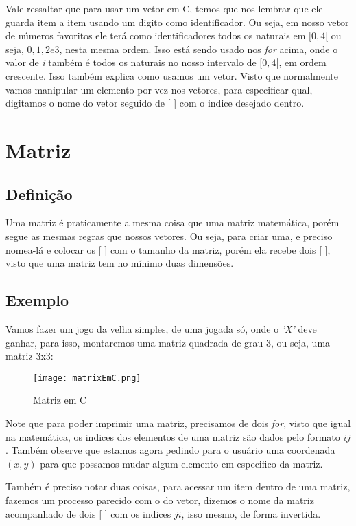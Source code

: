 \documentclass{article}
\begin{document}
    Vale ressaltar que para usar um vetor em C, temos que nos
    lembrar que ele guarda item a item usando um digito como
    identificador. Ou seja, em nosso vetor de números favoritos
    ele terá como identificadores todos os naturais em $[0, 4[$
    ou seja, $0, 1, 2 e 3$, nesta mesma ordem. Isso está sendo
    usado nos \emph{for} acima, onde o valor de \emph{i} também
    é todos os naturais no nosso intervalo de $[0,4[$, em ordem
    crescente. Isso também explica como usamos um vetor. Visto
    que normalmente vamos manipular um elemento por vez nos 
    vetores, para especificar qual, digitamos o nome do vetor
    seguido de [  ] com o indice desejado dentro.
    \newpage

    \section{Matriz}
    \subsection{Definição}
    Uma matriz é praticamente a mesma coisa que uma matriz
    matemática, porém segue as mesmas regras que nossos vetores.
    Ou seja, para criar uma, e preciso nomea-lá e colocar os
    [  ] com o tamanho da matriz, porém ela recebe dois [  ],
    visto que uma matriz tem no mínimo duas dimensões.

    \subsection*{Exemplo}
    Vamos fazer um jogo da velha simples, de uma jogada só, onde
    o \emph{'X'} deve ganhar, para isso, montaremos uma matriz
    quadrada de grau $3$, ou seja, uma matriz $3$x$3$:
    \begin{figure}[h]
        \centering
        \texttt{[image: matrixEmC.png]}
        \caption{Matriz em C}
        \label{fig:matrizEmC}
    \end{figure}

    Note que para poder imprimir uma matriz, precisamos de dois
    \emph{for}, visto que igual na matemática, os indices dos 
    elementos de uma matriz são dados pelo formato $ij$. Também
    observe que estamos agora pedindo para o usuário uma
    coordenada $(x,y)$ para que possamos mudar algum elemento
    em especifico da matriz.
    
    Também é preciso notar duas coisas, para acessar um item
    dentro de uma matriz, fazemos um processo parecido com o do
    vetor, dizemos o nome da matriz acompanhado de dois [  ]
    com os indices $ji$, isso mesmo, de forma invertida.
    \newpage
\end{document}
